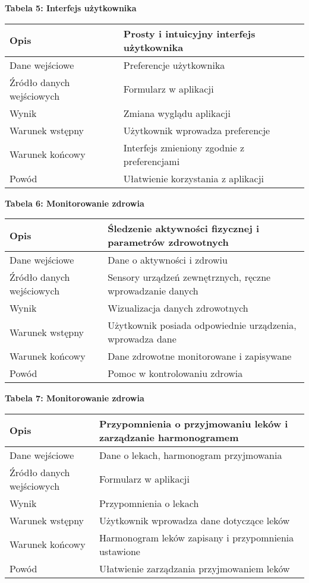 \textbf{Tabela 5: Interfejs użytkownika}
\begin{table}[h]
  \begin{tabular}{|p{3cm}|p{\dimexpr\textwidth-3cm\relax}|} \hline
    Opis & Prosty i intuicyjny interfejs użytkownika \\\hline
    Dane wejściowe & Preferencje użytkownika \\\hline
    Źródło danych wejściowych & Formularz w aplikacji \\\hline
    Wynik & Zmiana wyglądu aplikacji \\\hline
    Warunek wstępny & Użytkownik wprowadza preferencje \\\hline
    Warunek końcowy & Interfejs zmieniony zgodnie z preferencjami \\\hline
    Powód & Ułatwienie korzystania z aplikacji \\\hline
  \end{tabular}
\end{table}

\textbf{Tabela 6: Monitorowanie zdrowia}
\begin{table}[h]
  \begin{tabular}{|p{3cm}|p{\dimexpr\textwidth-3cm\relax}|} \hline
    Opis & Śledzenie aktywności ﬁzycznej i parametrów zdrowotnych \\\hline
    Dane wejściowe & Dane o aktywności i zdrowiu \\\hline
    Źródło danych wejściowych & Sensory urządzeń zewnętrznych, ręczne wprowadzanie danych \\\hline
    Wynik & Wizualizacja danych zdrowotnych \\\hline
    Warunek wstępny & Użytkownik posiada odpowiednie urządzenia, wprowadza dane \\\hline
    Warunek końcowy & Dane zdrowotne monitorowane i zapisywane \\\hline
    Powód & Pomoc w kontrolowaniu zdrowia \\\hline
  \end{tabular}
\end{table}

\newpage

\textbf{Tabela 7: Monitorowanie zdrowia}
\begin{table}[h]
  \begin{tabular}{|p{3cm}|p{\dimexpr\textwidth-3cm\relax}|} \hline
    Opis & Przypomnienia o przyjmowaniu leków i zarządzanie harmonogramem \\\hline
    Dane wejściowe & Dane o lekach, harmonogram przyjmowania \\\hline
    Źródło danych wejściowych & Formularz w aplikacji \\\hline
    Wynik & Przypomnienia o lekach \\\hline
    Warunek wstępny & Użytkownik wprowadza dane dotyczące leków \\\hline
    Warunek końcowy & Harmonogram leków zapisany i przypomnienia ustawione \\\hline
    Powód & Ułatwienie zarządzania przyjmowaniem leków \\\hline
  \end{tabular}
\end{table}

